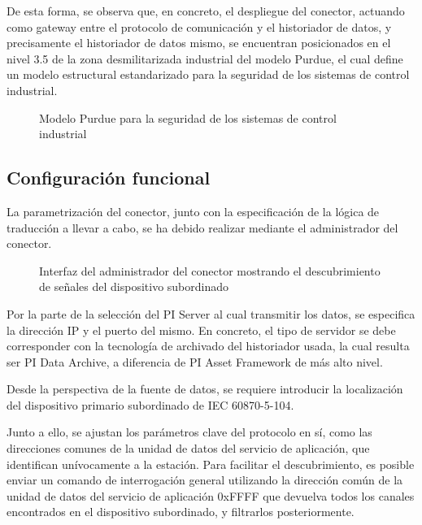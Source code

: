 De esta forma, se observa que, en concreto, el despliegue del conector, actuando como gateway entre el protocolo de comunicación y el historiador de datos, y precisamente el historiador de datos mismo, se encuentran posicionados en el nivel 3.5 de la zona desmilitarizada industrial del modelo Purdue, el cual define un modelo estructural estandarizado para la seguridad de los sistemas de control industrial.

\begin{figure}
\centering
\caption{Modelo Purdue para la seguridad de los sistemas de control industrial}
\label{fig:modelo-purdue}
\end{figure}

\subsection{Configuración funcional}
\label{makereference3.4.3}

La parametrización del conector, junto con la especificación de la lógica de traducción a llevar a cabo, se ha debido realizar mediante el administrador del conector.

\begin{figure}
\centering
\caption{Interfaz del administrador del conector mostrando el descubrimiento de señales del dispositivo subordinado}
\label{fig:administador-del-conector}
\end{figure}

Por la parte de la selección del PI Server al cual transmitir los datos, se especifica la dirección IP y el puerto del mismo. En concreto, el tipo de servidor se debe corresponder con la tecnología de archivado del historiador usada, la cual resulta ser PI Data Archive, a diferencia de PI Asset Framework de más alto nivel.

Desde la perspectiva de la fuente de datos, se requiere introducir la localización del dispositivo primario subordinado de IEC 60870-5-104.

Junto a ello, se ajustan los parámetros clave del protocolo en sí, como las direcciones comunes de la unidad de datos del servicio de aplicación, que identifican unívocamente a la estación. Para facilitar el descubrimiento, es posible enviar un comando de interrogación general utilizando la dirección común de la unidad de datos del servicio de aplicación 0xFFFF que devuelva todos los canales encontrados en el dispositivo subordinado, y filtrarlos posteriormente.

